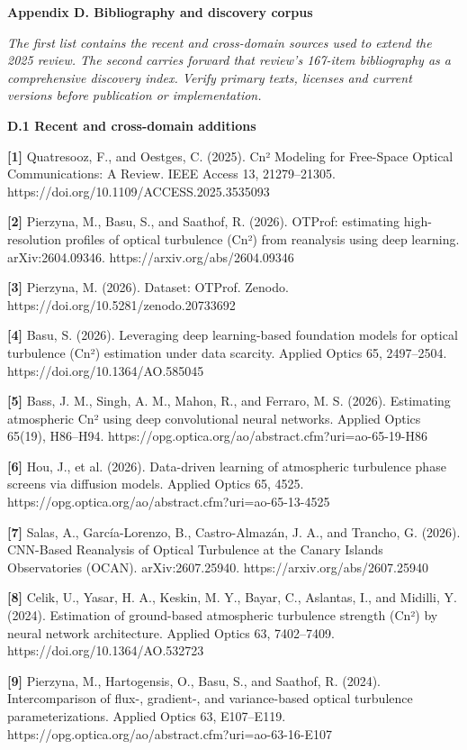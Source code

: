 \documentclass[
]{article}
\begin{document}
\textbf{Appendix D. Bibliography and discovery corpus}

\emph{The first list contains the recent and cross-domain sources used
to extend the 2025 review. The second carries forward that review's
167-item bibliography as a comprehensive discovery index. Verify primary
texts, licenses and current versions before publication or
implementation.}

\textbf{D.1 Recent and cross-domain additions}

\textbf{{[}1{]}} Quatresooz, F., and Oestges, C. (2025). Cn² Modeling
for Free-Space Optical Communications: A Review. IEEE Access 13,
21279--21305. https://doi.org/10.1109/ACCESS.2025.3535093

\textbf{{[}2{]}} Pierzyna, M., Basu, S., and Saathof, R. (2026). OTProf:
estimating high-resolution profiles of optical turbulence (Cn²) from
reanalysis using deep learning. arXiv:2604.09346.
https://arxiv.org/abs/2604.09346

\textbf{{[}3{]}} Pierzyna, M. (2026). Dataset: OTProf. Zenodo.
https://doi.org/10.5281/zenodo.20733692

\textbf{{[}4{]}} Basu, S. (2026). Leveraging deep learning-based
foundation models for optical turbulence (Cn²) estimation under data
scarcity. Applied Optics 65, 2497--2504.
https://doi.org/10.1364/AO.585045

\textbf{{[}5{]}} Bass, J. M., Singh, A. M., Mahon, R., and Ferraro, M.
S. (2026). Estimating atmospheric Cn² using deep convolutional neural
networks. Applied Optics 65(19), H86--H94.
https://opg.optica.org/ao/abstract.cfm?uri=ao-65-19-H86

\textbf{{[}6{]}} Hou, J., et al. (2026). Data-driven learning of
atmospheric turbulence phase screens via diffusion models. Applied
Optics 65, 4525.
https://opg.optica.org/ao/abstract.cfm?uri=ao-65-13-4525

\textbf{{[}7{]}} Salas, A., García-Lorenzo, B., Castro-Almazán, J. A.,
and Trancho, G. (2026). CNN-Based Reanalysis of Optical Turbulence at
the Canary Islands Observatories (OCAN). arXiv:2607.25940.
https://arxiv.org/abs/2607.25940

\textbf{{[}8{]}} Celik, U., Yasar, H. A., Keskin, M. Y., Bayar, C.,
Aslantas, I., and Midilli, Y. (2024). Estimation of ground-based
atmospheric turbulence strength (Cn²) by neural network architecture.
Applied Optics 63, 7402--7409. https://doi.org/10.1364/AO.532723

\textbf{{[}9{]}} Pierzyna, M., Hartogensis, O., Basu, S., and Saathof,
R. (2024). Intercomparison of flux-, gradient-, and variance-based
optical turbulence parameterizations. Applied Optics 63, E107--E119.
https://opg.optica.org/ao/abstract.cfm?uri=ao-63-16-E107
\end{document}
